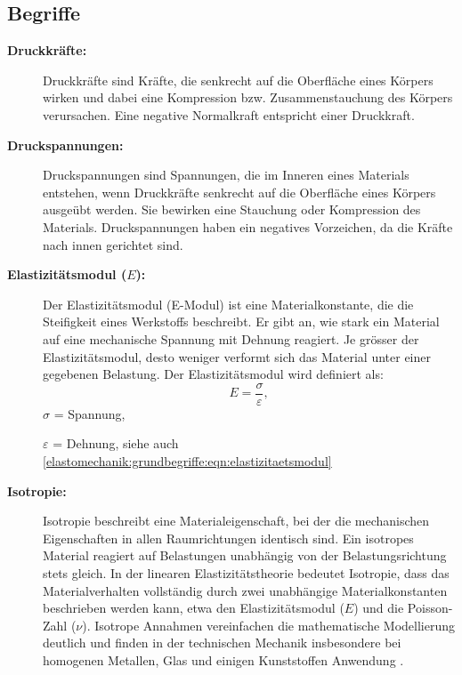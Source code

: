 \subsection{Begriffe}
\begin{description}
\item[\textbf{Druckkräfte:}] Druckkräfte sind Kräfte, die senkrecht auf die Oberfläche eines Körpers wirken und dabei eine Kompression bzw. Zusammenstauchung des Körpers verursachen. 
Eine negative Normalkraft entspricht einer Druckkraft.
	
\item[\textbf{Druckspannungen:}] Druckspannungen sind Spannungen, die im Inneren eines Materials entstehen, wenn Druckkräfte senkrecht auf die Oberfläche eines Körpers ausgeübt werden. 
Sie bewirken eine Stauchung oder Kompression des Materials.
Druckspannungen haben ein negatives Vorzeichen, da die Kräfte nach innen gerichtet sind.
	
\item[\textbf{Elastizitätsmodul ($E$):}] Der Elastizitätsmodul (E-Modul) ist eine Materialkonstante, die die Steifigkeit eines Werkstoffs beschreibt. 
Er gibt an, wie stark ein Material auf eine mechanische Spannung mit Dehnung reagiert. 
Je grösser der Elastizitätsmodul, desto weniger verformt sich das Material unter einer gegebenen Belastung.
Der Elastizitätsmodul wird definiert als:
	\begin{equation}
		E=
		\frac{\sigma}{\varepsilon},
		\label{elastomechanik:grundbegriffe:eqn:elastizitaetsmodul}
	\end{equation}
	$\sigma$ = Spannung,
	
	$\varepsilon$ = Dehnung, siehe auch \eqref{elastomechanik:grundbegriffe:eqn:elastizitaetsmodul}
	
\item[\textbf{Isotropie:}] Isotropie beschreibt eine Materialeigenschaft, bei der die mechanischen Eigenschaften in allen Raumrichtungen identisch sind. 
Ein isotropes Material reagiert auf Belastungen unabhängig von der Belastungsrichtung stets gleich.
In der linearen Elastizitätstheorie bedeutet Isotropie, dass das Materialverhalten vollständig durch zwei unabhängige Materialkonstanten beschrieben werden kann, etwa den Elastizitätsmodul ($E$) und die Poisson-Zahl ($\nu$).  
Isotrope Annahmen vereinfachen die mathematische Modellierung deutlich und finden in der technischen Mechanik insbesondere bei homogenen Metallen, Glas und einigen Kunststoffen Anwendung \cite{elastomechanik:Isotropie}.
	

\end{description}
